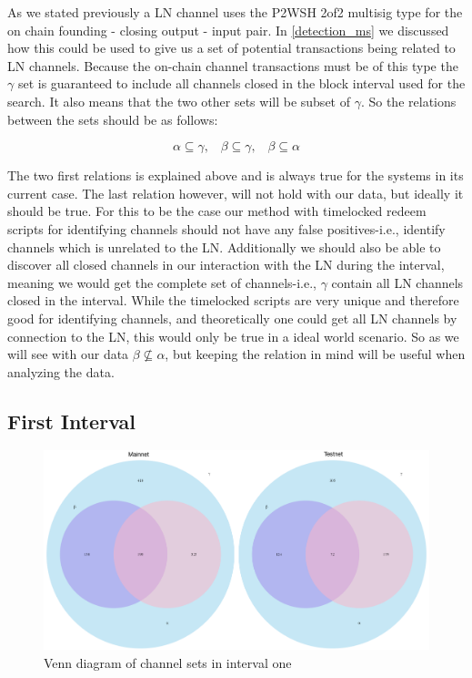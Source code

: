 As we stated previously a LN channel uses the P2WSH 2of2 multisig type for the on chain founding - closing output - input pair. In \cref{detection_ms} we discussed how this could be used to give us a set of potential transactions being related to LN channels. Because the on-chain channel transactions must be of this type the \( \gamma \) set is guaranteed to include all channels closed in the block interval used for the search. It also means that the two other sets will be subset of \( \gamma \). So the relations between the sets should be as follows:

\begin{equation} \label{eq:1}
      \alpha \subseteq \gamma, \hspace{10pt} \beta \subseteq \gamma, \hspace{10pt} \beta \subseteq \alpha  
\end{equation}

The two first relations is explained above and is always true for the systems in its current case. The last relation however, will not hold with our data, but ideally it should be true. For this to be the case our method with timelocked redeem scripts for identifying channels should not have any false positives-i.e., identify channels which is unrelated to the LN. Additionally we should also be able to discover all closed channels in our interaction with the LN during the interval, meaning we would get the complete set of channels-i.e., \( \gamma \) contain all LN channels closed in the interval. While the timelocked scripts are very unique and therefore good for identifying channels, and theoretically one could get all LN channels by connection to the LN, this would only be true in a ideal world scenario. So as we will see with our data \( \beta \not\subseteq \alpha \), but keeping the relation in mind will be useful when analyzing the data.

\subsection{First Interval}

\begin{figure}[ht]
    \centering
    \includegraphics[width=16cm]{figures/graphs/venn_full1.png}
    \caption{Venn diagram of channel sets in interval one}
    \label{fig:venn_run1}
\end{figure}

